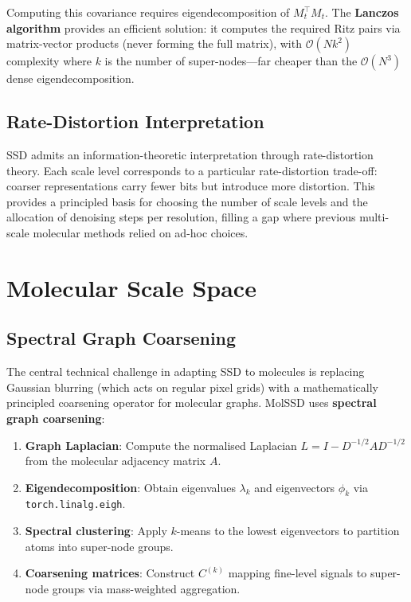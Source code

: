 \documentclass[11pt,a4paper]{article}
\begin{document}
Computing this covariance requires eigendecomposition of $M_t^\top M_t$.
The \textbf{Lanczos algorithm} provides an efficient solution: it computes
the required Ritz pairs via matrix-vector products (never forming the full
matrix), with $\mathcal{O}(Nk^2)$ complexity where $k$ is the number of
super-nodes---far cheaper than the $\mathcal{O}(N^3)$ dense
eigendecomposition.

\subsection{Rate-Distortion Interpretation}

SSD admits an information-theoretic interpretation through rate-distortion
theory. Each scale level corresponds to a particular rate-distortion
trade-off: coarser representations carry fewer bits but introduce more
distortion. This provides a principled basis for choosing the number of
scale levels and the allocation of denoising steps per resolution, filling
a gap where previous multi-scale molecular methods relied on ad-hoc
choices.

\section{Molecular Scale Space}

\subsection{Spectral Graph Coarsening}

The central technical challenge in adapting SSD to molecules is replacing
Gaussian blurring (which acts on regular pixel grids) with a mathematically
principled coarsening operator for molecular graphs. MolSSD uses
\textbf{spectral graph coarsening}:

\begin{enumerate}[leftmargin=2em]
  \item \textbf{Graph Laplacian}: Compute the normalised Laplacian
    $L = I - D^{-1/2}AD^{-1/2}$ from the molecular adjacency matrix $A$.
  \item \textbf{Eigendecomposition}: Obtain eigenvalues $\lambda_k$ and
    eigenvectors $\phi_k$ via \texttt{torch.linalg.eigh}.
  \item \textbf{Spectral clustering}: Apply $k$-means to the lowest
    eigenvectors to partition atoms into super-node groups.
  \item \textbf{Coarsening matrices}: Construct $C^{(k)}$ mapping fine-level
    signals to super-node groups via mass-weighted aggregation.
\end{enumerate}
\end{document}
